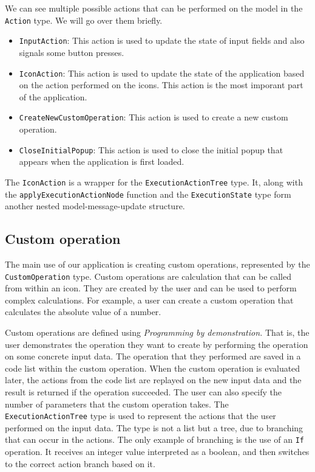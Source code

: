 \documentclass{report}
\begin{document}
We can see multiple possible actions that can be performed on the model in the \texttt{Action} type.
We will go over them briefly.
\begin{itemize}
    \item \texttt{InputAction}: This action is used to update the state of input fields and also signals some button presses.
    \item \texttt{IconAction}: This action is used to update the state of the application based on the action performed on the icons. This action is the most imporant part of the application.
    \item \texttt{CreateNewCustomOperation}: This action is used to create a new custom operation.
    \item \texttt{CloseInitialPopup}: This action is used to close the initial popup that appears when the application is first loaded.
\end{itemize}

The \texttt{IconAction} is a wrapper for the \texttt{ExecutionActionTree} type. It, along with the \texttt{applyExecutionActionNode} function and the \texttt{ExecutionState} type form another nested model-message-update structure.

\subsection*{Custom operation}
The main use of our application is creating custom operations, represented by the \texttt{CustomOperation} type.
Custom operations are calculation that can be called from within an icon. They are created by the user and can be used to perform complex calculations.
For example, a user can create a custom operation that calculates the absolute value of a number.

Custom operations are defined using \emph{Programming by demonstration.} That is, the user demonstrates the operation they want to create by performing the operation on some concrete input data.
The operation that they performed are saved in a code list within the custom operation. When the custom operation is evaluated later, the actions from the code list are replayed on the new input data and the result is returned if the operation succeeded.
The user can also specify the number of parameters that the custom operation takes.
The \texttt{ExecutionActionTree} type is used to represent the actions that the user performed on the input data.
The type is not a list but a tree, due to branching that can occur in the actions.
The only example of branching is the use of an \texttt{If} operation. It receives an integer value interpreted as a boolean, and then switches to the correct action branch based on it.
\end{document}
